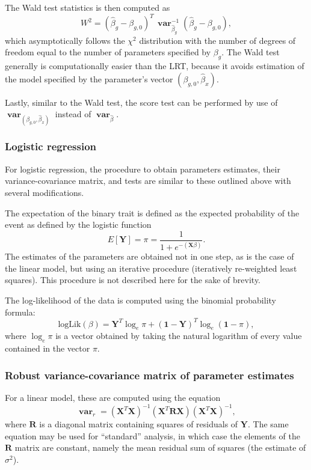 \documentclass[12pt,a4paper]{article}
\DeclareMathOperator{\var}{\mathbf{var}}
\begin{document}
The Wald test statistics is then computed as
$$
W^2 = (\hat{\beta}_g - \beta_{g,0})^T \,
\var_{\hat{\beta}_g}^{-1} (\hat{\beta}_g - \beta_{g,0}),
$$
which asymptotically follows the $\chi^2$ distribution with the number
of degrees of freedom equal to the number of parameters specified by
$\beta_g$. The Wald test generally is computationally easier than the
LRT, because it avoids estimation of the model specified by the
parameter's vector $(\beta_{g,0},\hat{\beta}_x)$.

Lastly, similar to the Wald test, the score test can be performed by use
of $\var_{(\beta_{g,0},\hat{\beta}_x)}$ instead of $\var_{\hat{\beta}}$.


\subsubsection{Logistic regression}
For logistic regression, the procedure to obtain
parameters estimates, their variance-covariance matrix, and tests are
similar to these outlined above with several modifications.

The expectation of the binary trait is defined as the expected
probability of the event as defined by the logistic
function
$$
E[\mathbf{Y}] = \pi = \frac{ 1 }{ 1 + e^{-(\mathbf{X}\beta)} }.
$$
The estimates of the parameters are obtained not in one
step, as is the case of the linear model, but using an iterative
procedure (iteratively re-weighted least squares). This
procedure is not described here for the sake of brevity.

The log-likelihood of the data is computed using the
binomial probability formula:
$$
\mathrm{logLik}(\beta) = \mathbf{Y}^T \log_e \pi + (\mathbf{1} -
\mathbf{Y})^T \log_e (\mathbf{1}-\pi),
$$
where $\log_e \pi$ is a vector obtained by taking the natural
logarithm of every value contained in the vector $\pi$.

\subsubsection{Robust variance-covariance matrix of parameter estimates}
For a linear model, these are computed using the equation
$$
\var_r = (\mathbf{X}^T\mathbf{X})^{-1} (\mathbf{X}^T\mathbf{R}\mathbf{X})
(\mathbf{X}^T\mathbf{X})^{-1},
$$
where $\mathbf{R}$ is a diagonal matrix containing squares of residuals
of $\mathbf{Y}$. The
same equation may be used for ``standard'' analysis, in which case
the elements of the $\mathbf{R}$ matrix are constant, namely the mean
residual sum of squares (the estimate of $\sigma^2$).
\end{document}
